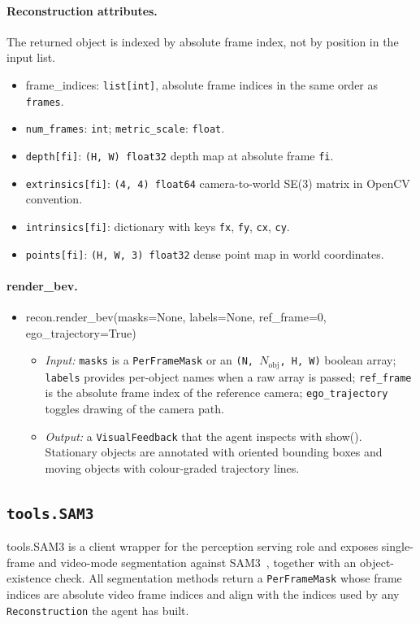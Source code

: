 \documentclass{llmxive}
\providecommand{\apicode}[1]{#1}
\begin{document}
\paragraph{Reconstruction attributes.} The returned object is indexed by absolute frame index, not by position in the input list.
\begin{itemize}[leftmargin=1.5em]
\item \apicode{frame_indices}: \texttt{list[int]}, absolute frame indices in the same order as \texttt{frames}.
\item \texttt{num\_frames}: \texttt{int}; \texttt{metric\_scale}: \texttt{float}.
\item \texttt{depth[fi]}: \texttt{(H, W) float32} depth map at absolute frame \texttt{fi}.
\item \texttt{extrinsics[fi]}: \texttt{(4, 4) float64} camera-to-world SE(3) matrix in OpenCV convention.
\item \texttt{intrinsics[fi]}: dictionary with keys \texttt{fx}, \texttt{fy}, \texttt{cx}, \texttt{cy}.
\item \texttt{points[fi]}: \texttt{(H, W, 3) float32} dense point map in world coordinates.
\end{itemize}

\paragraph{render\_bev.}
\begin{itemize}[leftmargin=1.5em]
\item \apicode{recon.render_bev(masks=None, labels=None, ref_frame=0, ego_trajectory=True)}
  \begin{itemize}
  \item \emph{Input:} \texttt{masks} is a \texttt{PerFrameMask} or an \texttt{(N, $N_{\text{obj}}$, H, W)} boolean array; \texttt{labels} provides per-object names when a raw array is passed; \texttt{ref\_frame} is the absolute frame index of the reference camera; \texttt{ego\_trajectory} toggles drawing of the camera path.
  \item \emph{Output:} a \texttt{VisualFeedback} that the agent inspects with \apicode{show()}. Stationary objects are annotated with oriented bounding boxes and moving objects with colour-graded trajectory lines.
  \end{itemize}
\end{itemize}

\subsection{\texttt{tools.SAM3}}
\label{app:tool_sam3}
\apicode{tools.SAM3} is a client wrapper for the perception serving role and exposes single-frame and video-mode segmentation against SAM3~\citep{carion2025sam}, together with an object-existence check. All segmentation methods return a \texttt{PerFrameMask} whose frame indices are absolute video frame indices and align with the indices used by any \texttt{Reconstruction} the agent has built.
\end{document}
